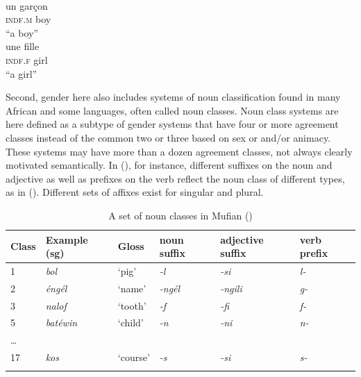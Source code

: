 \documentclass[output=collectionpaper]{langsci/langscibook}
\begin{document}
\ea
\label{ex:Sinne:3}
\\
\begin{xlist}
\ex
\gll un garçon\\
\textsc{indf.m} boy\\
\glt ``a boy''\\
\ex
\gll une fille\\
\textsc{indf.f} girl \\
\glt ``a girl''
\end{xlist}
\z

Second, gender here also includes systems of noun classification found in many African and some  languages, often called noun classes. Noun class systems are here defined as a subtype of gender systems that have four or more agreement classes instead of the common two or three based on sex or and/or animacy. These systems may have more than a dozen agreement classes, not always clearly motivated semantically. In  (), for instance, different suffixes on the noun and adjective as well as prefixes on the verb reflect the noun class of different types, as in  (\citealt{Alungum1978}). Different sets of affixes exist for singular and plural.

\begin{table}[htb]
\begin{tabularx}{\textwidth}{lXXXXX}
\lsptoprule
Class & Example (sg) & Gloss & noun suffix & adjective suffix & verb prefix\\
\midrule
1 & \textit{bol} & `pig' & \textit{{}-l} & \textit{{}-si} & \textit{l-}\\
2 & \textit{éngél} & `name' & \textit{{}-ngél} & \textit{{}-ngili} & \textit{g-}\\
3 & \textit{nalof} & `tooth' & \textit{{}-f} & \textit{{}-fi} & \textit{f-}\\
5 & \textit{batéwin} & `child' & \textit{{}-n} & \textit{{}-ni} & \textit{n-}\\
… &  &  &  &  & \\
17 & \textit{kos} & `course' & \textit{{}-s} & \textit{{}-si} & \textit{s-}\\
\lspbottomrule
\end{tabularx}
\caption{A set of noun classes in {Mufian} (\citealt[93]{Alungum1978})}
\label{tab:Sinne:1}
\end{table}
\end{document}
